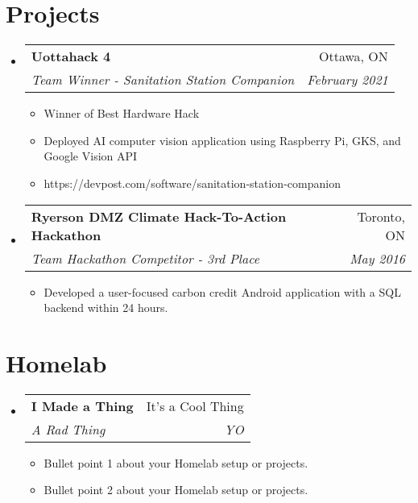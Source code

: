 \documentclass[letterpaper,11pt]{article}
\makeatletter
\newcommand{\resumeItem}[2]{
  \item\small{
    \textbf{#1}{#2 \vspace{-2pt}}
  }
}
\newcommand{\resumeSubheading}[4]{
  \vspace{-1pt}\item
    \begin{tabular*}{0.97\textwidth}[t]{l@{\extracolsep{\fill}}r}
      \textbf{#1} & #2 \\
      \textit{\small#3} & \textit{\small #4} \\
    \end{tabular*}\vspace{-5pt}
}
\newcommand{\resumeSubHeadingListStart}{\begin{itemize}[leftmargin=*]}
\newcommand{\resumeSubHeadingListEnd}{\end{itemize}}
\newcommand{\resumeItemListStart}{\begin{itemize}}
\newcommand{\resumeItemListEnd}{\end{itemize}\vspace{-5pt}}
\makeatother
\begin{document}
\section{Projects}
\resumeSubHeadingListStart
  \resumeSubheading
  {Uottahack 4}{Ottawa, ON}
  {Team Winner - Sanitation Station Companion}{February 2021}
    \resumeItemListStart
      \resumeItem{}
      {Winner of Best Hardware Hack}
      \resumeItem{}
      {Deployed AI computer vision application using Raspberry Pi, GKS, and Google Vision API}
      \resumeItem{}
      {https://devpost.com/software/sanitation-station-companion}
    \resumeItemListEnd
    
  \resumeSubheading
  {Ryerson DMZ Climate Hack-To-Action Hackathon}{Toronto, ON}
  {Team Hackathon Competitor - 3rd Place}{May 2016}
    \resumeItemListStart
      \resumeItem{}
      {Developed a user-focused carbon credit Android application with a SQL backend within 24 hours.}
    \resumeItemListEnd
\resumeSubHeadingListEnd

\section{Homelab}
\resumeSubHeadingListStart
  \resumeSubheading
  {I Made a Thing}{It's a Cool Thing}{A Rad Thing}{YO}
    \resumeItemListStart
      \resumeItem{}
      {Bullet point 1 about your Homelab setup or projects.}
      \resumeItem{}
      {Bullet point 2 about your Homelab setup or projects.}
    \resumeItemListEnd
\resumeSubHeadingListEnd
\end{document}
